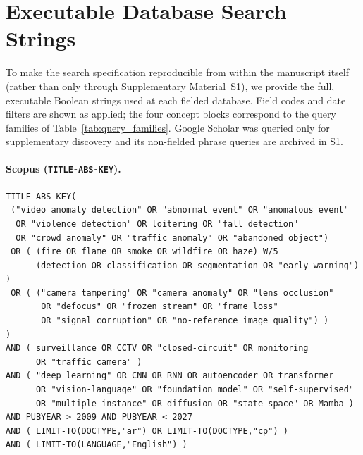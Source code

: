 \documentclass[10pt,a4paper]{article}
\begin{document}
\appendix

\section{Executable Database Search Strings}
\label{app:search_strings}
To make the search specification reproducible from within the manuscript itself (rather than only through Supplementary Material~S1), we provide the full, executable Boolean strings used at each fielded database. Field codes and date filters are shown as applied; the four concept blocks correspond to the query families of Table~\ref{tab:query_families}. Google Scholar was queried only for supplementary discovery and its non-fielded phrase queries are archived in S1.

\paragraph{Scopus (\texttt{TITLE-ABS-KEY}).}
\begin{small}
\begin{verbatim}
TITLE-ABS-KEY(
 ("video anomaly detection" OR "abnormal event" OR "anomalous event"
  OR "violence detection" OR loitering OR "fall detection"
  OR "crowd anomaly" OR "traffic anomaly" OR "abandoned object")
 OR ( (fire OR flame OR smoke OR wildfire OR haze) W/5
      (detection OR classification OR segmentation OR "early warning") )
 OR ( ("camera tampering" OR "camera anomaly" OR "lens occlusion"
       OR "defocus" OR "frozen stream" OR "frame loss"
       OR "signal corruption" OR "no-reference image quality") )
)
AND ( surveillance OR CCTV OR "closed-circuit" OR monitoring
      OR "traffic camera" )
AND ( "deep learning" OR CNN OR RNN OR autoencoder OR transformer
      OR "vision-language" OR "foundation model" OR "self-supervised"
      OR "multiple instance" OR diffusion OR "state-space" OR Mamba )
AND PUBYEAR > 2009 AND PUBYEAR < 2027
AND ( LIMIT-TO(DOCTYPE,"ar") OR LIMIT-TO(DOCTYPE,"cp") )
AND ( LIMIT-TO(LANGUAGE,"English") )
\end{verbatim}
\end{small}
\end{document}
